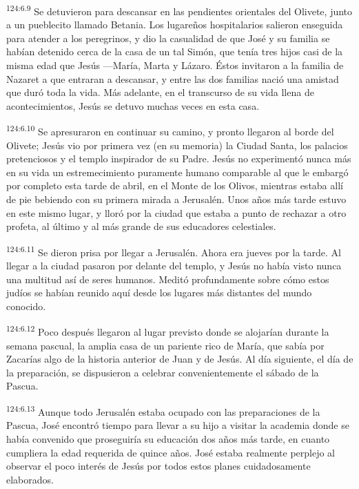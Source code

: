 \par 
\textsuperscript{124:6.9} Se detuvieron para descansar en las pendientes orientales del Olivete, junto a un pueblecito llamado Betania. Los lugareños hospitalarios salieron enseguida para atender a los peregrinos, y dio la casualidad de que José y su familia se habían detenido cerca de la casa de un tal Simón, que tenía tres hijos casi de la misma edad que Jesús ---María, Marta y Lázaro. Éstos invitaron a la familia de Nazaret a que entraran a descansar, y entre las dos familias nació una amistad que duró toda la vida. Más adelante, en el transcurso de su vida llena de acontecimientos, Jesús se detuvo muchas veces en esta casa.

\par 
\textsuperscript{124:6.10} Se apresuraron en continuar su camino, y pronto llegaron al borde del Olivete; Jesús vio por primera vez (en su memoria) la Ciudad Santa, los palacios pretenciosos y el templo inspirador de su Padre. Jesús no experimentó nunca más en su vida un estremecimiento puramente humano comparable al que le embargó por completo esta tarde de abril, en el Monte de los Olivos, mientras estaba allí de pie bebiendo con su primera mirada a Jerusalén. Unos años más tarde estuvo en este mismo lugar, y lloró por la ciudad que estaba a punto de rechazar a otro profeta, al último y al más grande de sus educadores celestiales.

\par 
\textsuperscript{124:6.11} Se dieron prisa por llegar a Jerusalén. Ahora era jueves por la tarde. Al llegar a la ciudad pasaron por delante del templo, y Jesús no había visto nunca una multitud así de seres humanos. Meditó profundamente sobre cómo estos judíos se habían reunido aquí desde los lugares más distantes del mundo conocido.

\par 
\textsuperscript{124:6.12} Poco después llegaron al lugar previsto donde se alojarían durante la semana pascual, la amplia casa de un pariente rico de María, que sabía por Zacarías algo de la historia anterior de Juan y de Jesús. Al día siguiente, el día de la preparación, se dispusieron a celebrar convenientemente el sábado de la Pascua.

\par 
\textsuperscript{124:6.13} Aunque todo Jerusalén estaba ocupado con las preparaciones de la Pascua, José encontró tiempo para llevar a su hijo a visitar la academia donde se había convenido que proseguiría su educación dos años más tarde, en cuanto cumpliera la edad requerida de quince años. José estaba realmente perplejo al observar el poco interés de Jesús por todos estos planes cuidadosamente elaborados.


